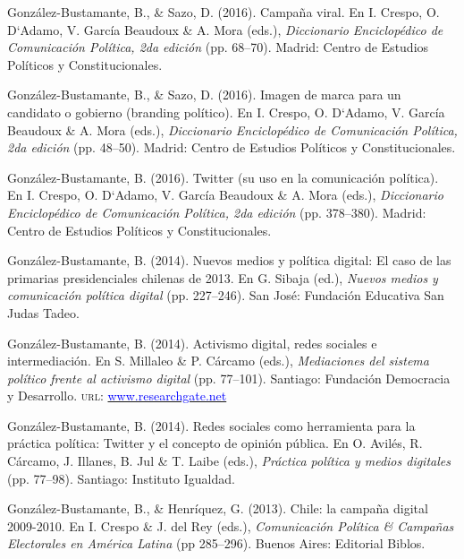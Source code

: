 \begin{publications}
\begin{benumerate}{12}
\item{González-Bustamante, B., \& Sazo, D. (2016). Campaña viral. En I. Crespo, O. D`Adamo, V. García Beaudoux \& A. Mora (eds.), {\itshape Diccionario Enciclopédico de Comunicación Política, 2da edición} (pp. 68--70). Madrid: Centro de Estudios Políticos y Constitucionales.}\vspace{1mm}

\item{González-Bustamante, B., \& Sazo, D. (2016). Imagen de marca para un candidato o gobierno (branding político). En I. Crespo, O. D`Adamo, V. García Beaudoux \& A. Mora (eds.), {\itshape Diccionario Enciclopédico de Comunicación Política, 2da edición} (pp. 48--50). Madrid: Centro de Estudios Políticos y Constitucionales.}\vspace{1mm}

\item{González-Bustamante, B. (2016). Twitter (su uso en la comunicación política). En I. Crespo, O. D`Adamo, V. García Beaudoux \& A. Mora (eds.), {\itshape Diccionario Enciclopédico de Comunicación Política, 2da edición} (pp. 378--380). Madrid: Centro de Estudios Políticos y Constitucionales.}\vspace{1mm}

\item{González-Bustamante, B. (2014). Nuevos medios y política digital: El caso de las primarias presidenciales chilenas de 2013. En G. Sibaja (ed.), {\itshape Nuevos  medios y comunicación política digital} (pp. 227--246). San José: Fundación Educativa San Judas Tadeo.}\vspace{1mm}

\item{González-Bustamante, B. (2014). Activismo digital, redes sociales e intermediación. En S. Millaleo \& P. C\'arcamo (eds.), {\itshape Mediaciones del  sistema político frente al activismo digital} (pp. 77--101). Santiago: Fundación Democracia y Desarrollo. {\scshape url:} \href{https://www.researchgate.net/publication/321992867_Activismo_digital_redes_sociales_e_intermediacion}{\textcolor{blue}{www.researchgate.net}}}\vspace{1mm}

\item{González-Bustamante, B. (2014). Redes sociales como herramienta para la práctica política: Twitter y el concepto de opinión pública. En O. Avilés, R. Cárcamo, J. Illanes, B. Jul \& T. Laibe (eds.), {\itshape Práctica política y medios digitales} (pp. 77--98). Santiago: Instituto Igualdad.}\vspace{1mm}

\item{González-Bustamante, B., \& Henríquez, G. (2013). Chile: la campaña digital 2009-2010. En I. Crespo \& J. del Rey (eds.), {\itshape Comunicación Política \& Campañas Electorales en América Latina} (pp 285--296). Buenos Aires: Editorial Biblos.}\vspace{1mm}

\end{benumerate}

\end{publications}
